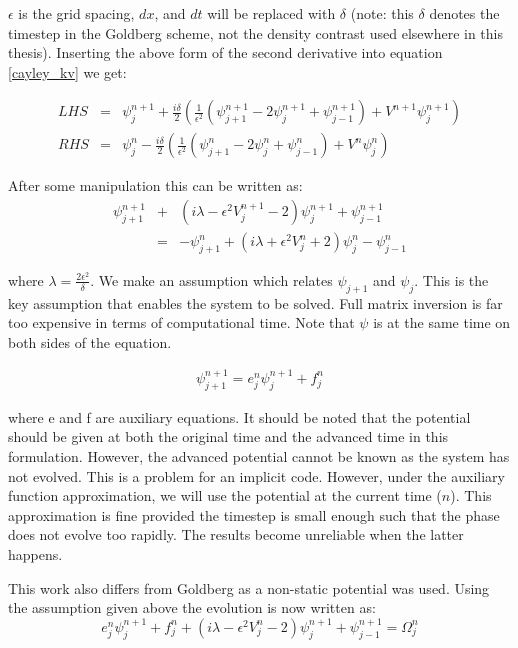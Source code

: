 \noindent $\epsilon$ is the grid spacing, $dx$, and $dt$ will be replaced with $\delta$ (note: this $\delta$ denotes the timestep in the Goldberg scheme, not the density contrast used elsewhere in this thesis). Inserting the above form of the second derivative into equation \ref{cayley_kv} we get:

\begin{eqnarray}
LHS &=&\psi_j^{n+1} +\frac{i\delta}{2} (\frac{1}{\epsilon^2} (\psi_{j+1}^{n+1} -2\psi_j^{n+1} +\psi_{j-1}^{n+1}) +V^{n+1}\psi_j^{n+1}) \nonumber \\
RHS &=& \psi_j^{n} - \frac{i\delta}{2} ( \frac{1}{\epsilon^2} (\psi_{j+1}^{n} - 2\psi_j^{n} + \psi_{j-1}^{n})  + V^n\psi_{j}^n)
\end{eqnarray}

\noindent After some manipulation this can be written as:
\begin{eqnarray}
\label{evol_psi}
\psi_{j+1}^{n+1} &+& (i\lambda - \epsilon^2 V_{j}^{n+1} -2) \psi_{j}^{n+1} + \psi_{j-1}^{n+1} \nonumber \\
	&=& - \psi_{j+1}^n + (i\lambda + \epsilon^2 V_{j}^n +2) \psi_{j}^n - \psi_{j-1}^n
\end{eqnarray}

\noindent where $\lambda = \frac{2\epsilon^2}{\delta}$. We make an assumption which relates $\psi_{j+1}$ and $\psi_j$. This is the key assumption that enables the system to be solved. Full matrix inversion is far too expensive in terms of computational time. Note that $\psi$ is at the same time on both sides of the equation.

\begin{eqnarray}
\psi_{j+1}^{n+1} = e_j^n \psi_j^{n+1}  + f_j^n
\end{eqnarray}

\noindent where e and f are auxiliary equations. It should be noted that the potential should be given at both the original time and the advanced time in this formulation. However, the advanced potential cannot be known as the system has not evolved. This is a problem for an implicit code. However, under the auxiliary function approximation, we will use the potential at the current time ($n$). This approximation is fine provided the timestep is small enough such that the phase does not evolve too rapidly. The results become unreliable when the latter happens.

This work also differs from Goldberg as a non-static potential was used. Using the assumption given above the evolution is now written as:
\begin{equation}
e_j^n \psi_{j}^{n+1} + f_j^n + (i\lambda - \epsilon^2 V_{j}^{n} -2) \psi_{j}^{n+1} + \psi_{j-1}^{n+1} = \Omega_j^n
\end{equation}

